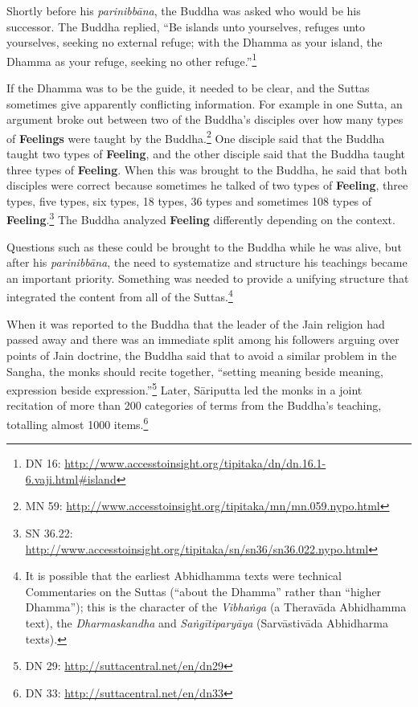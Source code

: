 Shortly before his \textit{parinibbāna}, the Buddha was asked who would be his successor. The Buddha replied, “Be islands unto yourselves, refuges unto yourselves, seeking no external refuge; with the Dhamma as your island, the Dhamma as your refuge, seeking no other refuge.”\footnote{DN 16: \url{http://www.accesstoinsight.org/tipitaka/dn/dn.16.1-6.vaji.html\#island}}

If the Dhamma was to be the guide, it needed to be clear, and the Suttas sometimes give apparently conflicting information. For example in one Sutta, an argument broke out between two of the Buddha’s disciples over how many types of \textbf{Feelings} were taught by the Buddha.\footnote{MN 59: \url{http://www.accesstoinsight.org/tipitaka/mn/mn.059.nypo.html}} One disciple said that the Buddha taught two types of \textbf{Feeling}, and the other disciple said that the Buddha taught three types of \textbf{Feeling}. When this was brought to the Buddha, he said that both disciples were correct because sometimes he talked of two types of \textbf{Feeling}, three types, five types, six types, 18 types, 36 types and sometimes 108 types of \textbf{Feeling}.\footnote{SN 36.22: \url{http://www.accesstoinsight.org/tipitaka/sn/sn36/sn36.022.nypo.html}} The Buddha analyzed \textbf{Feeling} differently depending on the context.

Questions such as these could be brought to the Buddha while he was alive, but after his \textit{parinibbāna}, the need to systematize and structure his teachings became an important priority. Something was needed to provide a unifying structure that integrated the content from all of the Suttas.\footnote{It is possible that the earliest Abhidhamma texts were technical Commentaries on the Suttas (“about the Dhamma” rather than “higher Dhamma”); this is the character of the \textit{Vibhaṅga} (a Theravāda Abhidhamma text), the \textit{Dharmaskandha} and \textit{Saṅgītiparyāya} (Sarvāstivāda Abhidharma texts).}

When it was reported to the Buddha that the leader of the Jain religion had passed away and there was an immediate split among his followers arguing over points of Jain doctrine, the Buddha said that to avoid a similar problem in the Sangha, the monks should recite together, “setting meaning beside meaning, expression beside expression.”\footnote{DN 29: \url{http://suttacentral.net/en/dn29}} Later, Sāriputta led the monks in a joint recitation of more than 200 categories of terms from the Buddha’s teaching, totalling almost 1000 items.\footnote{DN 33: \url{http://suttacentral.net/en/dn33}}

